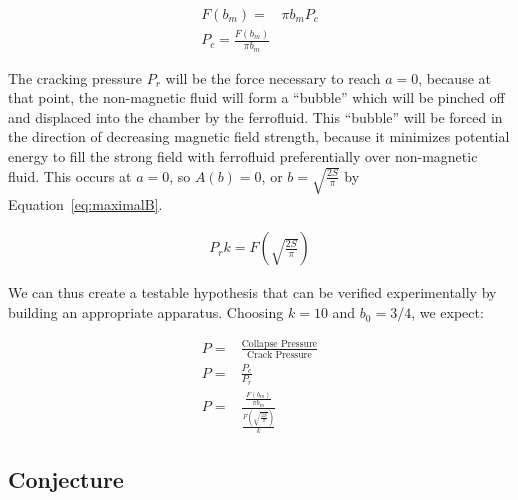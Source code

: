 \documentclass[]{asme2ej}
\begin{document}
\begin{align}
  F(b_m) = & \pi b_m P_c \\
  P_c = \frac{F(b_m)}{\pi b_m}
\end{align}

The cracking pressure $P_r$ will be the force necessary to reach $a = 0$, because at that point,
the non-magnetic fluid will form a ``bubble'' which will be pinched off and displaced into the chamber
by the ferrofluid. This ``bubble'' will be forced in the direction of decreasing magnetic field strength,
because it minimizes potential energy to fill the strong field with ferrofluid preferentially over
non-magnetic fluid. This occurs at $a = 0$, so $A(b) = 0$, or $b = \sqrt{\frac{2S}{\pi}}$ by Equation~\ref{eq:maximalB}.

\begin{align}
  P_r k = F(\sqrt{\frac{2S}{\pi}})
\end{align}

We can thus create a testable hypothesis that can be verified experimentally by building an appropriate
apparatus. Choosing $k = 10$ and $b_0 = 3/4$, we expect:

\begin{align}
  P = & \frac{\text{Collapse Pressure}}{\text{Crack Pressure}} \\
  P = & \frac{P_c}{P_r} \\
  P = & \frac{\frac{F(b_m)}{\pi b_m}}{\frac{F(\sqrt{\frac{2S}{\pi}})}{k}}
\end{align}


\subsection{Conjecture}
\end{document}
